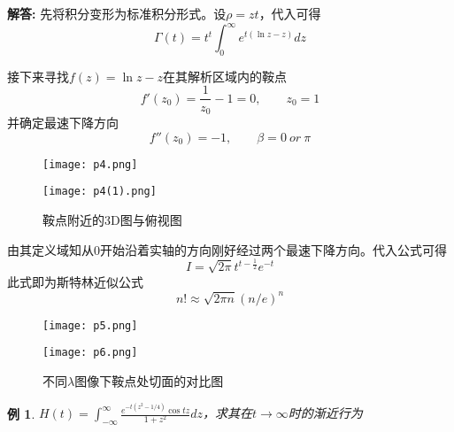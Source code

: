 \documentclass[12pt, a4paper, oneside]{ctexart}
\newenvironment{solution}
  {\par\noindent\textbf{解答:}\quad}
  {\par}
\newtheorem{example}[theorem]{例}
\begin{document}
\begin{solution}
    先将积分变形为标准积分形式。设$\rho=zt$，代入可得
    \begin{equation}
        \Gamma(t)=t^t \int_0^{\infty}e^{t(\ln z-z)}dz
    \end{equation}
\end{solution}
接下来寻找$f(z)=\ln z-z$在其解析区域内的鞍点
\begin{equation}
    f'(z_0)=\frac{1}{z_0}-1=0,\qquad z_0=1
\end{equation}
并确定最速下降方向
\begin{equation}
    f''(z_0)=-1,\qquad \beta= 0 \ or \ \pi
\end{equation}
\begin{figure}[htbp]
    \centering
    \begin{minipage}[b]{0.4\textwidth}
        \texttt{[image: p4.png]}
        \label{fig:image1}
    \end{minipage}
    \hfill %
    \begin{minipage}[b]{0.4\textwidth}
        \texttt{[image: p4(1).png]}
        \label{fig:image2}
    \end{minipage}
    \caption{鞍点附近的3D图与俯视图}
    \label{fig:both_images}
    \end{figure}
\newpage
由其定义域知从0开始沿着实轴的方向刚好经过两个最速下降方向。代入公式可得
\begin{equation}
    I=\sqrt{2\pi}t^{t-\frac{1}{2}}e^{-t}
\end{equation}
此式即为斯特林近似公式
\begin{equation}
    n!\approx\sqrt{2\pi n}(n/e)^n
\end{equation}
\begin{figure}[htbp]
    \centering
    \begin{minipage}[b]{0.48\textwidth}
        \texttt{[image: p5.png]}
        \label{fig:image1}
    \end{minipage}
    \hfill %
    \begin{minipage}[b]{0.48\textwidth}
        \texttt{[image: p6.png]}
        \label{fig:image2}
    \end{minipage}
    \caption{不同$\lambda$图像下鞍点处切面的对比图}
    \label{fig:both_images}
    \end{figure}
\begin{example}
    $H(t) = \int_{-\infty}^{\infty} \frac{e^{-t(z^2 - 1/4)} \cos t z}{1 + z^2} dz$，求其在$t\rightarrow\infty$时的渐近行为
\end{example}
\end{document}
